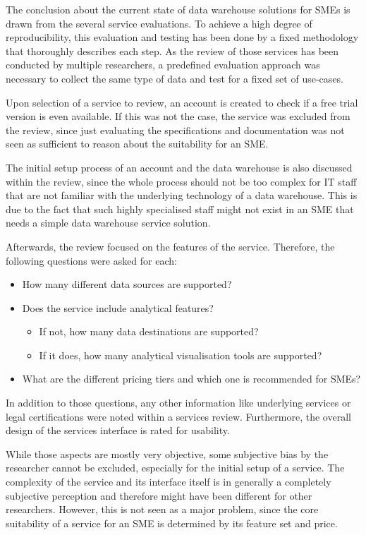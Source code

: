 \documentclass[../paper.tex]{subfiles}
\begin{document}
The conclusion about the current state of data warehouse solutions for SMEs is
drawn from the several service evaluations. To achieve a high degree of
reproducibility, this evaluation and testing has been done by a fixed
methodology that thoroughly describes each step. As the review of those
services has been conducted by multiple researchers, a predefined evaluation
approach was necessary to collect the same type of data and test for a fixed
set of use-cases.

Upon selection of a service to review, an account is created to check if a free
trial version is even available. If this was not the case, the service was
excluded from the review, since just evaluating the specifications and
documentation was not seen as sufficient to reason about the suitability for
an SME.

The initial setup process of an account and the data warehouse is also discussed
within the review, since the whole process should not be too complex for IT
staff that are not familiar with the underlying technology of a data warehouse.
This is due to the fact that such highly specialised staff might not exist in
an SME that needs a simple data warehouse service solution.

Afterwards, the review focused on the features of the service. Therefore, the
following questions were asked for each:

\begin{itemize}
  \item How many different data sources are supported?
  \item Does the service include analytical features?
    \begin{itemize}
      \item If not, how many data destinations are supported?
      \item If it does, how many analytical visualisation tools are supported?
    \end{itemize}
  \item What are the different pricing tiers and which one is recommended for SMEs?
\end{itemize}

In addition to those questions, any other information like underlying services
or legal certifications were noted within a services review. Furthermore, the
overall design of the services interface is rated for usability.

While those aspects are mostly very objective, some subjective bias by the
researcher cannot be excluded, especially for the initial setup of a service.
The complexity of the service and its interface itself is in generally a
completely subjective perception and therefore might have been different for
other researchers. However, this is not seen as a major problem, since the core
suitability of a service for an SME is determined by its feature set and price.
\end{document}
